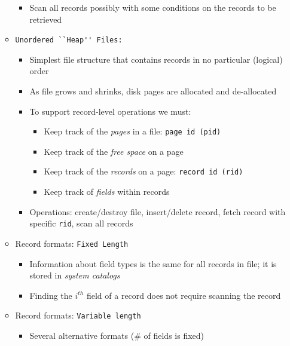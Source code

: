 \documentclass[landscape,8pt]{extarticle}
\newcommand{\code}{\lstinline}
\begin{document}
\begin{multicols}{4}
\begin{itemize}
\begin{itemize}
\begin{itemize}
                            \item Scan all records possibly with some conditions on the records to be retrieved
                        \end{itemize}
                  \item \code{Unordered ``Heap'' Files:}
                        \begin{itemize}
                            \item Simplest file structure that contains records in no particular (logical) order
                            \item As file grows and shrinks, disk pages are allocated and de-allocated
                            \item To support record-level operations we must:
                                  \begin{itemize}
                                      \item Keep track of the \emph{pages} in a file: \code{page id (pid)}
                                      \item Keep track of the \emph{free space} on a page
                                      \item Keep track of the \emph{records} on a page: \code{record id (rid)}
                                      \item Keep track of \emph{fields} within records
                                  \end{itemize}
                            \item Operations: create/destroy file, insert/delete record, fetch record with specific \code{rid}, scan all records
                        \end{itemize}
                  \item Record formats: \code{Fixed Length}
                        \begin{itemize}
                            \item Information about field types is the same for all records in file; it is stored in \emph{system catalogs}
                            \item Finding the $i^{th}$ field of a record does not require scanning the record
                        \end{itemize}
                  \item Record formats: \code{Variable length}
                        \begin{itemize}
                            \item Several alternative formats (\# of fields is fixed)

\end{itemize}
\end{itemize}
\end{itemize}
\end{multicols}
\end{document}
